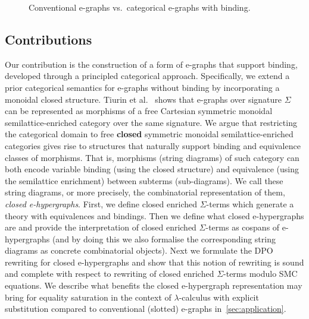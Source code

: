 \begin{figure}
	\captionsetup{skip=0pt}
	\begin{subfigure}{\linewidth}
		\label{fig:e-graph-substitution}
	\end{subfigure}
	\begin{subfigure}{\linewidth}
		\label{fig:e-string-substitution}
	\end{subfigure}
	\caption{Conventional e-graphs vs.\ categorical e-graphs with binding.}
\end{figure}

\subsection{Contributions}
Our contribution is the construction of a form of e-graphs that support binding, developed through a principled categorical approach.
Specifically, we extend a prior categorical semantics for e-graphs without binding by incorporating a monoidal closed structure.
Tiurin et al.~\cite{tiurin2025equivalencehypergraphsdporewriting} shows that e-graphs over signature $\Sigma$ can be represented as morphisms of a free Cartesian symmetric monoidal semilattice-enriched category over the same signature.
We argue that restricting the categorical domain to free \textbf{closed} symmetric monoidal semilattice-enriched categories gives rise to structures that naturally support binding and equivalence classes of morphisms.
That is, morphisms (string diagrams) of such category can both encode variable binding (using the closed structure) and equivalence (using the semilattice enrichment) between subterms (sub-diagrams).
We call these string diagrams, or more precisely, the combinatorial representation of them, \emph{closed e-hypergraphs}.
First, we define closed enriched $\Sigma$-terms which generate a theory with equivalences and bindings.
Then we define what closed e-hypergraphs are and provide the interpretation of closed enriched $\Sigma$-terms as cospans of e-hypergraphs (and by doing this we also formalise the corresponding string diagrams as concrete combinatorial objects).
Next we formulate the DPO rewriting for closed e-hypergraphs and show that this notion of rewriting is sound and complete with respect to rewriting of closed enriched $\Sigma$-terms modulo SMC equations.
We describe what benefits the closed e-hypergraph representation may bring for equality saturation in the context of $\lambda$-calculus with explicit substitution compared to conventional (slotted) e-graphs in~\autoref{sec:application}.
